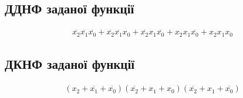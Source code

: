 \documentclass{article}
\begin{document}
\begin{normalsize}
	\subsection*{ДДНФ заданої функції}
	\begin{large}
		\begin{gather}
			\overline{x_2}\overline{x_1}\overline{x_0}+\overline{x_2}\overline{x_1}x_0+\overline{x_2}x_1\overline{x_0}+x_2x_1\overline{x_0}+x_2x_1x_0	\nonumber
		\end{gather}
	\end{large}
	
	\subsection*{ДКНФ заданої функції}
	\begin{large}
		\begin{gather}
			(x_2+\overline{x_1}+\overline{x_0})(\overline{x_2}+x_1+x_0)(\overline{x_2}+x_1+\overline{x_0})\nonumber
		\end{gather}
	\end{large}


\end{normalsize}
\end{document}
